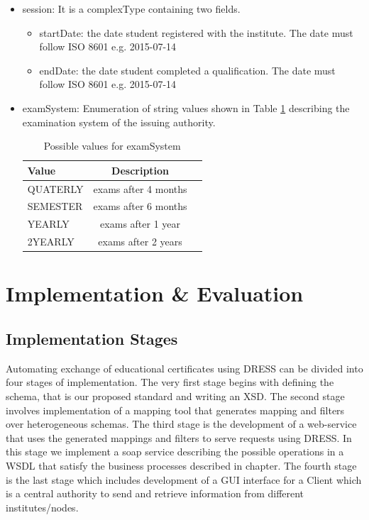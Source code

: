 \documentclass[12pt,a4paper,oneside]{book}
\begin{document}
\begin{itemize}
\item session: It is a complexType containing two fields.

	 \begin{itemize}
	 	\item startDate: the date student registered with the institute. The date must follow ISO 8601 e.g. 2015-07-14
	 	\item endDate: the date student completed a qualification. The date must follow ISO 8601 e.g. 2015-07-14
	 \end{itemize}

\item examSystem: Enumeration of string values shown in Table \ref{tab:examSystem} describing the examination system of the issuing authority.

\begin{table}[!tbh]
\caption{Possible values for examSystem}
\label{tab:examSystem}
\centering
\begin{tabular}[width=\columnwidth]{|p{1.3in}|c|c|}
\hline
Value       		& Description \\
\hline
QUATERLY 	    & exams after 4 months \\
SEMESTER	    & exams after 6 months \\
YEARLY			& exams after 1 year \\
2YEARLY	    	& exams after 2 years \\
\hline
\end{tabular}
\end{table}



\end{itemize}

\chapter{Implementation \& Evaluation}\label{ch-implement}


\section{Implementation Stages}
Automating exchange of educational certificates using DRESS can be divided into four stages of implementation. The very first stage begins with defining the schema, that is our proposed standard and writing an XSD. The second stage involves implementation of a mapping tool that generates mapping and filters over heterogeneous schemas. The third stage is the development of a web-service that uses the generated mappings and filters to serve requests using DRESS. In this stage we implement a soap service describing the possible operations in a WSDL that satisfy the business processes described in chapter. The fourth stage is the last stage which includes development of a GUI interface for a Client which is a central authority to send and retrieve information from different institutes/nodes.
 
\end{document}
